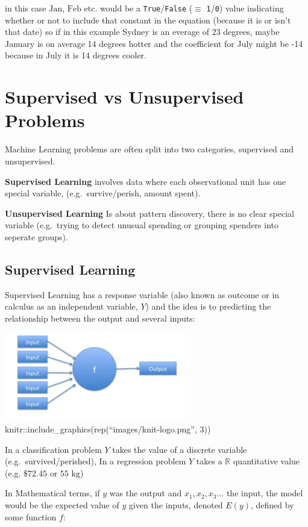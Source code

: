 \documentclass[]{book}
\begin{document}
in this case \(\text{Jan}\), \(\text{Feb}\) etc. would be a
\texttt{True}/\texttt{False} (\(\equiv\) \texttt{1}/\texttt{0}) value
indicating whether or not to include that constant in the equation
(because it is or isn't that date) so if in this example Sydney is an
everage of 23 degrees, maybe January is on average 14 degrees hotter and
the coefficient for July might be -14 because in July it is 14 degrees
cooler.

\section{Supervised vs Unsupervised
Problems}\label{supervised-vs-unsupervised-problems}

Machine Learning problems are often split into two categories,
supervised and unsupervised.

\textbf{Supervised Learning} involves data where each observational unit
has one special variable, (e.g.~survive/perish, amount spent).

\textbf{Unsupervised Learning} Is about pattern discovery, there is no
clear special variable (e.g.~trying to detect unusual spending or
grouping spenders into seperate groups).

\subsection{Supervised Learning}\label{supervised-learning}

Supervised Learning has a response variable (also known as outcome or in
calculus as an independent variable, \(Y\)) and the idea is to
predicting the relationship between the output and several inputs:

\includegraphics{images/supfunc300px.jpg}
knitr::include\_graphics(rep(``images/knit-logo.png'', 3))

In a classification problem \(Y\) takes the value of a discrete variable
(e.g.~survived/perished), In a regression problem \(Y\) takes a
\(\mathbb{R}\) quantitative value (e.g. \(\$72.45\) or
\(55 \text{ kg}\))

In Mathematical terms, if \(y\) was the output and
\(x_1, x_2, x_3 \dots\) the input, the model would be the expected value
of \(y\) given the inputs, denoted \(E(y)\), defined by some function
\(f\):
\end{document}
